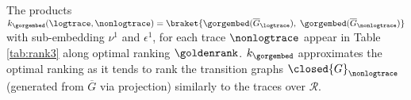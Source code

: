 \begin{example}%
	The products $k_{\gorgembed}(\logtrace,\nonlogtrace)=\braket{\gorgembed(\overline{G}_\logtrace),\;\gorgembed(\overline{G}_{\nonlogtrace})}$ 
	with sub-embedding $\nu^1$ and $\epsilon^1$, for each trace $\nonlogtrace$ appear in 
	Table \ref{tab:rank3} along optimal ranking $\goldenrank$. $k_{\gorgembed}$ approximates the optimal ranking as it tends to rank the transition graphs $\closed{G}_\nonlogtrace$ (generated from $\overline{G}$ via projection) similarly to the traces over $\mathcal{R}$.
\end{example}
%
%	

